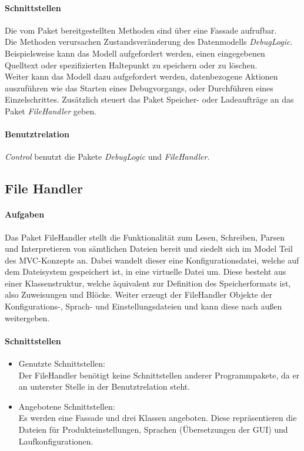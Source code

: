 ﻿\documentclass[parskip=full]{scrartcl}
\begin{document}
\paragraph{Schnittstellen}
    Die vom Paket bereitgestellten Methoden sind über eine Fassade aufrufbar.\\
    Die Methoden verursachen Zustandsveränderung des Datenmodells \textit{DebugLogic}.\\
    Beispielsweise kann das Modell aufgefordert werden, einen eingegebenen Quelltext oder spezifizierten Haltepunkt
    zu speichern oder zu löschen.\\
    Weiter kann das Modell dazu aufgefordert werden, datenbezogene Aktionen auszuführen wie
    das Starten eines Debugvorgangs, oder Durchführen eines Einzelschrittes. Zusätzlich steuert das Paket Speicher- oder Ladeaufträge an das Paket \textit{FileHandler} geben. 
\paragraph{Benutztrelation}
    \textit{Control} benutzt die Pakete \textit{DebugLogic} und \textit{FileHandler}.%

\subsection{File Handler}
\paragraph{Aufgaben}
Das Paket FileHandler stellt die Funktionalität zum Lesen, Schreiben, Parsen und Interpretieren von sämtlichen Dateien bereit und siedelt sich im Model Teil des MVC-Konzepts an.
Dabei wandelt dieser eine Konfigurationsdatei, welche auf dem Dateisystem gespeichert ist, in eine virtuelle Datei um.
Diese besteht aus einer Klassenstruktur, welche äquivalent zur Definition des Speicherformats ist, also Zuweisungen und Blöcke.
Weiter erzeugt der FileHandler Objekte der Konfigurations-, Sprach- und Einstellungsdateien und kann diese nach außen weitergeben.
\paragraph{Schnittstellen}
\begin{itemize}
\item Genutzte Schnittstellen: \\
Der FileHandler benötigt keine Schnittstellen anderer Programmpakete, da er an unterster Stelle in der Benutztrelation steht.
\item Angebotene Schnittstellen: \\
Es werden eine Fassade und drei Klassen angeboten.
Diese repräsentieren die Dateien für Produkteinstellungen, Sprachen (Übersetzungen der GUI) und Laufkonfigurationen.

\end{itemize}
\end{document}
